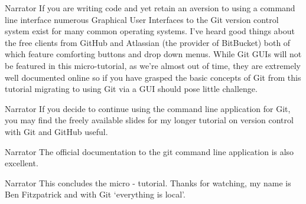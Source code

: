 \documentclass{screenplay} %
\begin{document}
\begin{dialogue}{Narrator}
If you are writing code and yet retain an aversion to using a command line interface numerous Graphical User Interfaces to the Git version control system exist for many common operating systems.
\newline
\newline
I've heard good things about the free clients from GitHub and Atlassian (the provider of BitBucket) both of which feature comforting buttons and drop down menus.
While Git GUIs will not be featured in this micro-tutorial, as we're almost out of time, they are extremely well documented online so if you have grasped the basic concepts of Git from this tutorial migrating to using Git via a GUI should pose little challenge.
\end{dialogue}

\begin{dialogue}{Narrator} 
If you decide to continue using the command line application for Git, you may find the freely available slides for my longer tutorial on version control with Git and GitHub useful.
\end{dialogue}

\begin{dialogue}{Narrator} 
The official documentation to the git command line application is also excellent.
\end{dialogue}

\begin{dialogue}{Narrator}
This concludes the micro - tutorial.
Thanks for watching, my name is Ben Fitzpatrick and with Git `everything is local'.
\end{dialogue}

\fadeout
\theend
\end{document}
